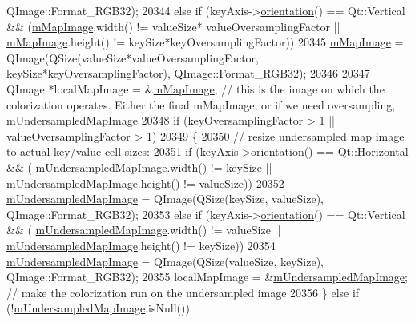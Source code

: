 \begin{DoxyCode}
      QImage::Format\_RGB32);
20344   \textcolor{keywordflow}{else} \textcolor{keywordflow}{if} (keyAxis->\hyperlink{class_q_c_p_axis_a57483f2f60145ddc9e63f3af53959265}{orientation}() == Qt::Vertical && (\hyperlink{class_q_c_p_color_map_a66110813b42eca78b64095b2a1f285a0}{mMapImage}.width() != valueSize*
      valueOversamplingFactor || \hyperlink{class_q_c_p_color_map_a66110813b42eca78b64095b2a1f285a0}{mMapImage}.height() != keySize*keyOversamplingFactor))
20345     \hyperlink{class_q_c_p_color_map_a66110813b42eca78b64095b2a1f285a0}{mMapImage} = QImage(QSize(valueSize*valueOversamplingFactor, keySize*keyOversamplingFactor), 
      QImage::Format\_RGB32);
20346   
20347   QImage *localMapImage = &\hyperlink{class_q_c_p_color_map_a66110813b42eca78b64095b2a1f285a0}{mMapImage}; \textcolor{comment}{// this is the image on which the colorization operates.
       Either the final mMapImage, or if we need oversampling, mUndersampledMapImage}
20348   \textcolor{keywordflow}{if} (keyOversamplingFactor > 1 || valueOversamplingFactor > 1)
20349   \{
20350     \textcolor{comment}{// resize undersampled map image to actual key/value cell sizes:}
20351     \textcolor{keywordflow}{if} (keyAxis->\hyperlink{class_q_c_p_axis_a57483f2f60145ddc9e63f3af53959265}{orientation}() == Qt::Horizontal && (
      \hyperlink{class_q_c_p_color_map_acad3d52f3572436d5f2e4057911ea8d3}{mUndersampledMapImage}.width() != keySize || 
      \hyperlink{class_q_c_p_color_map_acad3d52f3572436d5f2e4057911ea8d3}{mUndersampledMapImage}.height() != valueSize))
20352       \hyperlink{class_q_c_p_color_map_acad3d52f3572436d5f2e4057911ea8d3}{mUndersampledMapImage} = QImage(QSize(keySize, valueSize), QImage::Format\_RGB32);
20353     \textcolor{keywordflow}{else} \textcolor{keywordflow}{if} (keyAxis->\hyperlink{class_q_c_p_axis_a57483f2f60145ddc9e63f3af53959265}{orientation}() == Qt::Vertical && (
      \hyperlink{class_q_c_p_color_map_acad3d52f3572436d5f2e4057911ea8d3}{mUndersampledMapImage}.width() != valueSize || 
      \hyperlink{class_q_c_p_color_map_acad3d52f3572436d5f2e4057911ea8d3}{mUndersampledMapImage}.height() != keySize))
20354       \hyperlink{class_q_c_p_color_map_acad3d52f3572436d5f2e4057911ea8d3}{mUndersampledMapImage} = QImage(QSize(valueSize, keySize), QImage::Format\_RGB32);
20355     localMapImage = &\hyperlink{class_q_c_p_color_map_acad3d52f3572436d5f2e4057911ea8d3}{mUndersampledMapImage}; \textcolor{comment}{// make the colorization run on the
       undersampled image}
20356   \} \textcolor{keywordflow}{else} \textcolor{keywordflow}{if} (!\hyperlink{class_q_c_p_color_map_acad3d52f3572436d5f2e4057911ea8d3}{mUndersampledMapImage}.isNull())

\end{DoxyCode}
